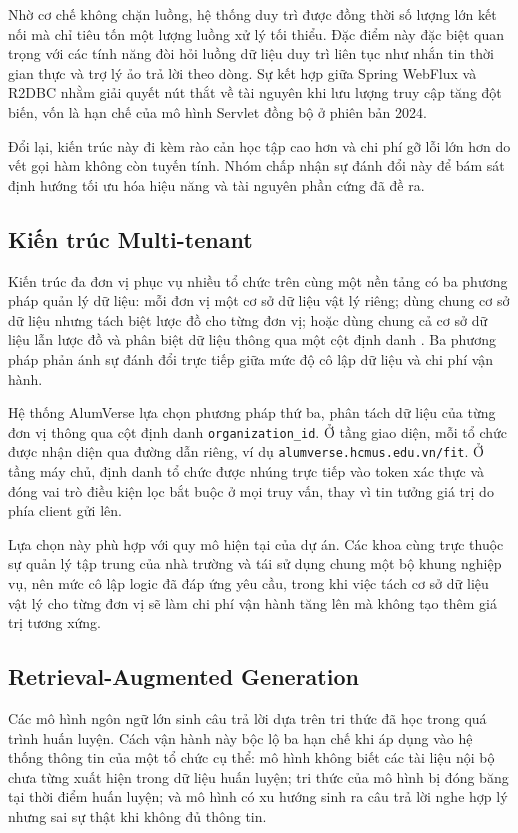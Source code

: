 \documentclass[12pt,a4paper,oneside]{report}
\begin{document}
Nhờ cơ chế không chặn luồng, hệ thống duy trì được đồng thời số lượng lớn kết nối mà chỉ tiêu tốn một lượng luồng xử lý tối thiểu. Đặc điểm này đặc biệt quan trọng với các tính năng đòi hỏi luồng dữ liệu duy trì liên tục như nhắn tin thời gian thực và trợ lý ảo trả lời theo dòng. Sự kết hợp giữa Spring WebFlux và R2DBC nhằm giải quyết nút thắt về tài nguyên khi lưu lượng truy cập tăng đột biến, vốn là hạn chế của mô hình Servlet đồng bộ ở phiên bản 2024.

Đổi lại, kiến trúc này đi kèm rào cản học tập cao hơn và chi phí gỡ lỗi lớn hơn do vết gọi hàm không còn tuyến tính. Nhóm chấp nhận sự đánh đổi này để bám sát định hướng tối ưu hóa hiệu năng và tài nguyên phần cứng đã đề ra.

\subsection{Kiến trúc Multi-tenant}

Kiến trúc đa đơn vị phục vụ nhiều tổ chức trên cùng một nền tảng có ba phương pháp quản lý dữ liệu: mỗi đơn vị một cơ sở dữ liệu vật lý riêng; dùng chung cơ sở dữ liệu nhưng tách biệt lược đồ cho từng đơn vị; hoặc dùng chung cả cơ sở dữ liệu lẫn lược đồ và phân biệt dữ liệu thông qua một cột định danh \cite{multitenant}. Ba phương pháp phản ánh sự đánh đổi trực tiếp giữa mức độ cô lập dữ liệu và chi phí vận hành.

Hệ thống AlumVerse lựa chọn phương pháp thứ ba, phân tách dữ liệu của từng đơn vị thông qua cột định danh \texttt{organization\_id}. Ở tầng giao diện, mỗi tổ chức được nhận diện qua đường dẫn riêng, ví dụ \texttt{alumverse.hcmus.edu.vn/fit}. Ở tầng máy chủ, định danh tổ chức được nhúng trực tiếp vào token xác thực và đóng vai trò điều kiện lọc bắt buộc ở mọi truy vấn, thay vì tin tưởng giá trị do phía client gửi lên.

Lựa chọn này phù hợp với quy mô hiện tại của dự án. Các khoa cùng trực thuộc sự quản lý tập trung của nhà trường và tái sử dụng chung một bộ khung nghiệp vụ, nên mức cô lập logic đã đáp ứng yêu cầu, trong khi việc tách cơ sở dữ liệu vật lý cho từng đơn vị sẽ làm chi phí vận hành tăng lên mà không tạo thêm giá trị tương xứng.

\subsection{Retrieval-Augmented Generation}

Các mô hình ngôn ngữ lớn sinh câu trả lời dựa trên tri thức đã học trong quá trình huấn luyện. Cách vận hành này bộc lộ ba hạn chế khi áp dụng vào hệ thống thông tin của một tổ chức cụ thể: mô hình không biết các tài liệu nội bộ chưa từng xuất hiện trong dữ liệu huấn luyện; tri thức của mô hình bị đóng băng tại thời điểm huấn luyện; và mô hình có xu hướng sinh ra câu trả lời nghe hợp lý nhưng sai sự thật khi không đủ thông tin.
\end{document}
